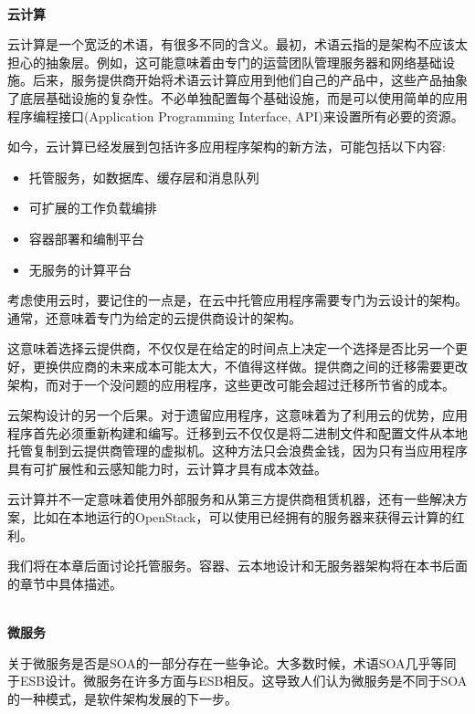 \hspace*{\fill} \\ %
\noindent
\textbf{云计算}

云计算是一个宽泛的术语，有很多不同的含义。最初，术语云指的是架构不应该太担心的抽象层。例如，这可能意味着由专门的运营团队管理服务器和网络基础设施。后来，服务提供商开始将术语云计算应用到他们自己的产品中，这些产品抽象了底层基础设施的复杂性。不必单独配置每个基础设施，而是可以使用简单的应用程序编程接口(Application Programming Interface, API)来设置所有必要的资源。

如今，云计算已经发展到包括许多应用程序架构的新方法，可能包括以下内容:

\begin{itemize}
\item 
托管服务，如数据库、缓存层和消息队列

\item 
可扩展的工作负载编排

\item 
容器部署和编制平台

\item 
无服务的计算平台
\end{itemize}

考虑使用云时，要记住的一点是，在云中托管应用程序需要专门为云设计的架构。通常，还意味着专门为给定的云提供商设计的架构。

这意味着选择云提供商，不仅仅是在给定的时间点上决定一个选择是否比另一个更好，更换供应商的未来成本可能太大，不值得这样做。提供商之间的迁移需要更改架构，而对于一个没问题的应用程序，这些更改可能会超过迁移所节省的成本。

云架构设计的另一个后果。对于遗留应用程序，这意味着为了利用云的优势，应用程序首先必须重新构建和编写。迁移到云不仅仅是将二进制文件和配置文件从本地托管复制到云提供商管理的虚拟机。这种方法只会浪费金钱，因为只有当应用程序具有可扩展性和云感知能力时，云计算才具有成本效益。

云计算并不一定意味着使用外部服务和从第三方提供商租赁机器，还有一些解决方案，比如在本地运行的OpenStack，可以使用已经拥有的服务器来获得云计算的红利。

我们将在本章后面讨论托管服务。容器、云本地设计和无服务器架构将在本书后面的章节中具体描述。

\hspace*{\fill} \\ %
\noindent
\textbf{微服务}

关于微服务是否是SOA的一部分存在一些争论。大多数时候，术语SOA几乎等同于ESB设计。微服务在许多方面与ESB相反。这导致人们认为微服务是不同于SOA的一种模式，是软件架构发展的下一步。

